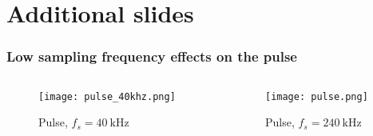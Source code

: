 \documentclass[UKenglish,8pt,aspectratio=1610]{beamer}
\begin{document}
\section{Additional slides}
\begin{frame}
	\frametitle{Low sampling frequency effects on the pulse}
		\begin{columns}
		\begin{column}{0.5\textwidth}
			\vspace{-25pt}
			\begin{figure}[h!]
				\texttt{[image: pulse\_40khz.png]}
				\centering
			\caption{Pulse, $f_s=40~\si{\kilo\hertz}$}
			\end{figure}
		\end{column}
		\begin{column}{0.5\textwidth}
			\vspace{-25pt}
		\begin{figure}[h!]
			\texttt{[image: pulse.png]}
			\centering
			\caption{Pulse, $f_s=240~\si{\kilo\hertz}$}
		\end{figure}
		\end{column}
	\end{columns} 

\end{frame}
\end{document}
